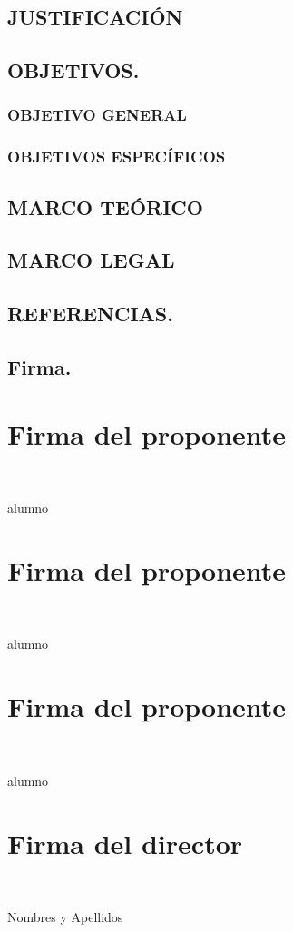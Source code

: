 \documentclass[10pt]{article}
\begin{document}
\section{JUSTIFICACIÓN}
  


\section{OBJETIVOS.}

\subsection{OBJETIVO GENERAL}

\subsection{OBJETIVOS ESPECÍFICOS}


\section{MARCO TEÓRICO}

\section{MARCO LEGAL}


\section{REFERENCIAS.}

 

\newpage
\section{Firma.}

\chapter{ \textbf{Firma del proponente }}
\\[20pt]


\makebox[2.5in]{\hrulefill} 

alumno \\ 

\chapter{ \textbf{Firma del proponente }}
\\[20pt]


\makebox[2.5in]{\hrulefill} 

alumno \\ 

\chapter{ \textbf{Firma del proponente }}
\\[20pt]


\makebox[2.5in]{\hrulefill} 

alumno \\ 

\chapter{  \textbf{Firma del director }}
\\[20pt]

\makebox[2.5in]{\hrulefill} 

Nombres y Apellidos\\
\end{document}
